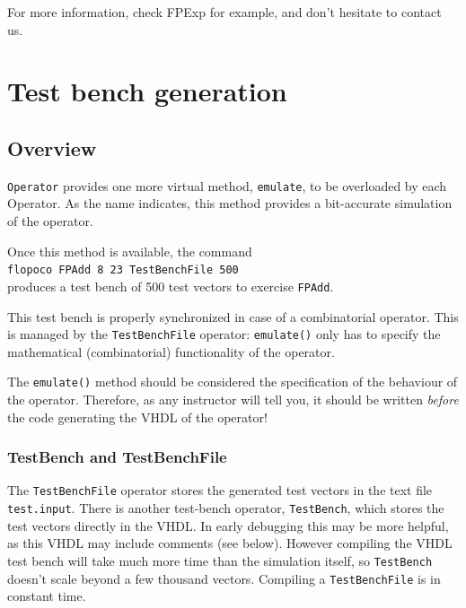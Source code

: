 \documentclass{article}
\begin{document}
For more information, check FPExp for example, and
don't hesitate to contact us.


\section{Test bench generation}\label{sec:test-bench-gener}

\subsection{Overview}
\texttt{\small Operator} provides one more virtual method, \texttt{\small emulate},
to be overloaded by each Operator. As the name indicates, this method
provides a bit-accurate simulation of the operator.
 
Once this method is available, the command\\
 \texttt{flopoco FPAdd 8 23 TestBenchFile 500} \\
produces a test bench of 500 test vectors to exercise \texttt{\small FPAdd}. 

This test bench is properly synchronized in case of a combinatorial
operator. This is managed by the \texttt{\small TestBenchFile} operator:
\texttt{\small emulate()} only has to specify the mathematical
(combinatorial) functionality of the operator.

The \texttt{\small emulate()} method should be considered  the specification of
the behaviour of the operator. Therefore, as any instructor will tell
you, it should be written \emph{before} the code generating the VHDL
of the operator!

\subsubsection{TestBench and TestBenchFile}
The \texttt{\small TestBenchFile} operator stores the generated test vectors in the text file \texttt{\small test.input}.
There is another test-bench operator, \texttt{\small TestBench}, which stores the test vectors directly in the VHDL. In early debugging this may be more helpful, as this VHDL may include comments (see below). However compiling the VHDL test bench will take much more time than the simulation itself, so \texttt{\small TestBench} doesn't scale beyond a few thousand vectors. Compiling a \texttt{\small TestBenchFile} is in constant time.
\end{document}
